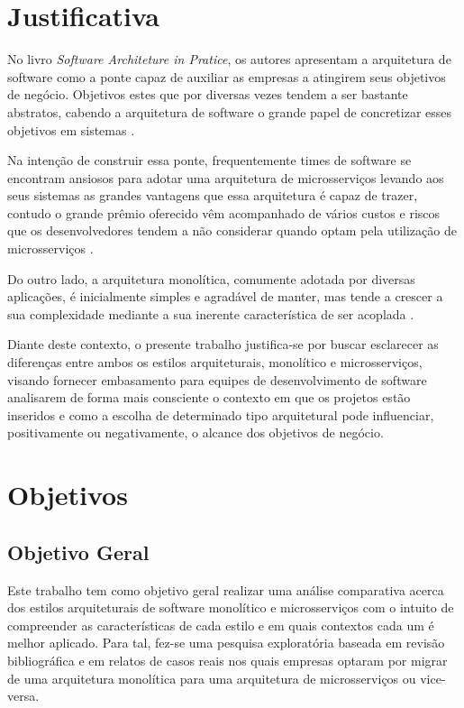 \section{Justificativa}
\label{justificativa}

No livro \textit{Software Architeture in Pratice}, os autores 
apresentam a arquitetura de software como a ponte capaz de auxiliar as empresas a atingirem seus
objetivos de negócio. Objetivos estes que por diversas vezes tendem a ser bastante abstratos,
cabendo a arquitetura de software o grande papel de concretizar esses objetivos em sistemas
\cite{Bass2015:SoftwareArchitetureInPratice}.

Na intenção de construir essa ponte, frequentemente times de software se encontram ansiosos para
adotar uma arquitetura de microsserviços levando aos seus sistemas as grandes vantagens que essa
arquitetura é capaz de trazer, contudo o grande prêmio oferecido vêm acompanhado de vários custos e
riscos que os desenvolvedores tendem a não considerar quando optam pela utilização de
microsserviços \cite{MartinFowler:MicroservicePremium}.

Do outro lado, a arquitetura monolítica, comumente adotada por diversas aplicações, é inicialmente
simples e agradável de manter, mas tende a crescer a sua complexidade mediante a sua inerente
característica de ser acoplada \cite{StefanTilkov:DontStartWithAMonolith}.

Diante deste contexto, o presente trabalho justifica-se por buscar esclarecer as diferenças entre
ambos os estilos arquiteturais, monolítico e microsserviços, visando fornecer embasamento para equipes
de desenvolvimento de software analisarem de forma mais consciente o contexto em que os projetos
estão inseridos e como a escolha de determinado tipo arquitetural pode influenciar, positivamente ou
negativamente, o alcance dos objetivos de negócio.

\section{Objetivos}

\subsection{Objetivo Geral}
\label{sec:ObjetivoGeral}

Este trabalho tem como objetivo geral realizar uma análise comparativa acerca dos estilos
arquiteturais de software monolítico e microsserviços com o intuito de compreender as
características de cada estilo e em quais contextos cada um é melhor aplicado. Para tal, fez-se
uma pesquisa exploratória baseada em revisão bibliográfica e em relatos de casos reais nos
quais empresas optaram por migrar de uma arquitetura monolítica para uma arquitetura de
microsserviços ou vice-versa.


